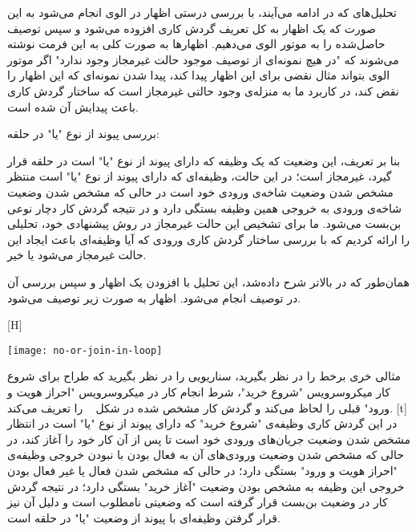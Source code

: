 تحلیل‌های که در ادامه می‌آیند، با بررسی درستی اظهار در الوی انجام می‌شود به این صورت که یک اظهار به کل تعریف گردش کاری افزوده می‌شود و سپس توصیف حاصل‌شده را به موتور الوی می‌دهیم. اظهارها به صورت کلی به این فرمت نوشته می‌شوند که "در هیچ نمونه‌ای از توصیف موجود حالت غیرمجاز وجود ندارد" اگر موتور الوی بتواند مثال نقضی برای این اظهار پیدا کند، پیدا شدن نمونه‌ای که این اظهار را نقض کند، در کاربرد ما به منزله‌ی وجود حالتی غیرمجاز است که ساختار گردش کاری باعث پیدایش آن شده است.

 بررسی پیوند از نوع "یا" در حلقه: 

بنا بر تعریف، این وضعیت که یک وظیفه که دارای پیوند از نوع "یا" است در حلقه قرار گیرد، غیرمجاز است؛ در این حالت، وظیفه‌ای که دارای پیوند از نوع "یا" است منتظر مشخص شدن وضعیت شاخه‌ی ورودی خود است در حالی که مشخص شدن وضعیت شاخه‌ی ورودی به خروجی همین وظیفه بستگی دارد و در نتیجه گردش کار دچار نوعی بن‌بست می‌شود. ما برای تشخیص این حالت غیرمجاز در روش پیشنهادی خود، تحلیلی را ارائه کردیم که با بررسی ساختار گردش کاری ورودی که آیا وظیفه‌ای باعث ایجاد این حالت غیرمجاز می‌شود یا خیر.

همان‌طور که در بالاتر شرح داده‌شد، این تحلیل با افزودن یک اظهار و سپس بررسی آن در توصیف انجام‌ می‌شود. اظهار به صورت زیر توصیف می‌شود. 



[H]
\raggedright
\texttt{[image: no-or-join-in-loop]}
\vspace{0.5em}

مثالی خری برخط را در نظر بگیرید، سناریویی را در نظر بگیرید که طراح برای شروع کار میکروسرویس "شروع خرید"، شرط انجام کار در میکروسرویس "احراز هویت و ورود" قبلی را لحاظ می‌کند و گردش کار مشخص شده در شکل ~ را تعریف می‌کند. 
[t]
\vspace{0.5em}
در این گردش کاری وظیفه‌ی "شروع خرید" که دارای پیوند از نوع "یا" است در انتظار مشخص شدن وضعیت جریان‌های ورودی‌ خود است تا پس از آن کار خود را آغاز کند، در حالی که مشخص شدن وضعیت ورودی‌های آن به فعال بودن با نبودن خروجی وظیفه‌ی "احراز هویت و ورود" بستگی دارد؛ در حالی که مشخص شدن فعال یا غیر فعال بودن خروجی این وظیفه به مشخص بودن وضعیت "آغاز خرید" بستگی دارد؛ در نتیجه گردش کار در وضعیت بن‌بست قرار گرفته است که وضعیتی نامطلوب است و دلیل آن نیز قرار گرفتن وظیفه‌ای با پیوند از وضعیت "یا" در حلقه است.

